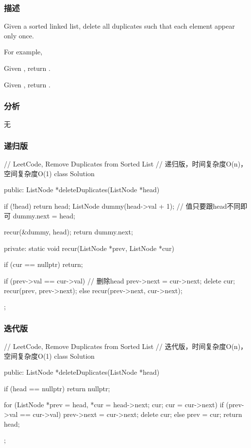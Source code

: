 \subsubsection{描述}
Given a sorted linked list, delete all duplicates such that each element appear only once.

For example,

Given , return .

Given , return .


\subsubsection{分析}
无


\subsubsection{递归版}
\begin{Code}
// LeetCode, Remove Duplicates from Sorted List
// 递归版，时间复杂度O(n)，空间复杂度O(1)
class Solution {
public:
    ListNode *deleteDuplicates(ListNode *head) {
        if (!head) return head;
        ListNode dummy(head->val + 1); // 值只要跟head不同即可
        dummy.next = head;

        recur(&dummy, head);
        return dummy.next;
    }
private:
    static void recur(ListNode *prev, ListNode *cur) {
        if (cur == nullptr) return;

        if (prev->val == cur->val) { // 删除head
            prev->next = cur->next;
            delete cur;
            recur(prev, prev->next);
        } else {
            recur(prev->next, cur->next);
        }
    }
};
\end{Code}


\subsubsection{迭代版}
\begin{Code}
// LeetCode, Remove Duplicates from Sorted List
// 迭代版，时间复杂度O(n)，空间复杂度O(1)
class Solution {
public:
    ListNode *deleteDuplicates(ListNode *head) {
        if (head == nullptr) return nullptr;

        for (ListNode *prev = head, *cur = head->next; cur; cur = cur->next) {
            if (prev->val == cur->val) {
                prev->next = cur->next;
                delete cur;
            } else {
                prev = cur;
            }
        }
        return head;
    }
};
\end{Code}


